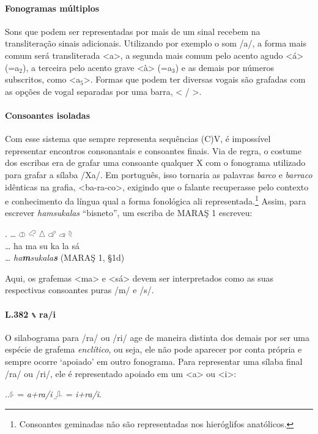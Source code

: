 \paragraph{Fonogramas múltiplos}
Sons que podem ser representadas por mais de um sinal recebem na transliteração
sinais adicionais. Utilizando por exemplo o som /a/, a forma mais comum será
transliterada <a>, a segunda mais comum pelo acento agudo <á> (=a$_2$), a terceira
pelo acento grave <à> (=a$_3$) e as demais por números subscritos, como <a$_5$>.
Formas que podem ter diversas vogais são grafadas com as opções de vogal
separadas por uma barra, < \slash{} >.

\paragraph{Consoantes isoladas}
Com esse sistema que sempre representa sequências {(C)}V, é impossível
representar encontros consonantais e consoantes finais.
Via de regra, o costume dos escribas era de grafar uma consoante qualquer X com
o fonograma utilizado para grafar a sílaba /Xa/.
Em português, isso tornaria as palavras \emph{barco} e \emph{barraco} idênticas
na grafia, <ba-ra-co>, exigindo que o falante recuperasse pelo contexto e
conhecimento da língua qual a forma fonológica ali
representada.\footnote{Consoantes geminadas não são representadas nos
	hieróglifos anatólicos.}
Assim, para escrever \emph{hamsukalas} ``bisneto'', um escriba de MARAŞ 1 escreveu:

\exg. \ldots{} \Large 𔓷 \Large 𔒅 \Large 𔖢 \Large 𔗧 \Large 𔓊 \Large 𔗦\\
\ldots{} ha ma su ka la sá\\
\ldots{} \emph{ha\textbf{m}sukala\textbf{s}} (MARAŞ 1, §1d)

Aqui, os grafemas <ma> e <sá> devem ser interpretados como as suas respectivas
consoantes puras /m/ e /s/.

\paragraph{L.382 𔖲 ra\slash{}i} O silabograma para /ra/ ou /ri/ age de maneira
distinta dos demais por ser uma espécie de grafema \emph{enclítico}, ou seja,
ele não pode aparecer por conta própria e sempre ocorre `apoiado' em outro
fonograma.
Para representar uma sílaba final /ra/ ou /ri/, ele é representado apoiado em um
<a> ou <i>:

\ex.\a.{\Large 𔗸} = \emph{a+ra\slash{}i}
\b.{\Large 𔓰} = \emph{i+ra\slash{}i}.


